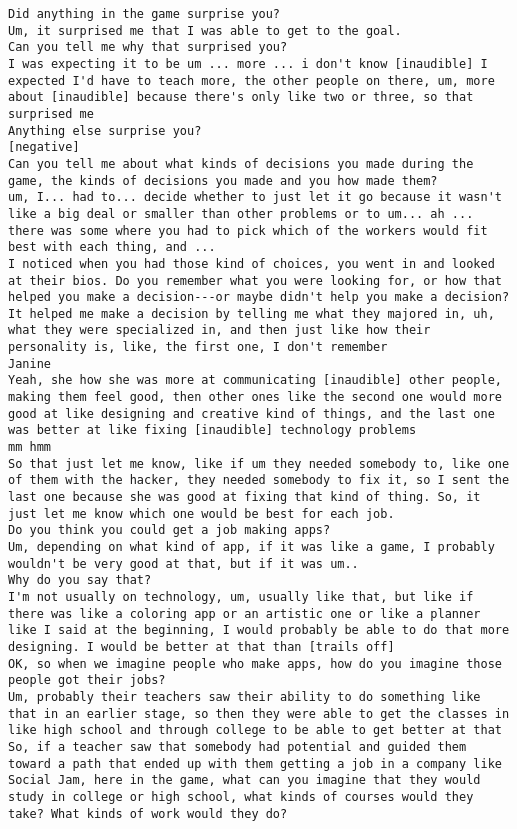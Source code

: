\begin{lstlisting}
Did anything in the game surprise you?
Um, it surprised me that I was able to get to the goal. 
Can you tell me why that surprised you?
I was expecting it to be um ... more ... i don't know [inaudible] I expected I'd have to teach more, the other people on there, um, more about [inaudible] because there's only like two or three, so that surprised me
Anything else surprise you?
[negative]
Can you tell me about what kinds of decisions you made during the game, the kinds of decisions you made and you how made them?
um, I... had to... decide whether to just let it go because it wasn't like a big deal or smaller than other problems or to um... ah ... there was some where you had to pick which of the workers would fit best with each thing, and ... 
I noticed when you had those kind of choices, you went in and looked at their bios. Do you remember what you were looking for, or how that helped you make a decision---or maybe didn't help you make a decision?
It helped me make a decision by telling me what they majored in, uh, what they were specialized in, and then just like how their personality is, like, the first one, I don't remember
Janine
Yeah, she how she was more at communicating [inaudible] other people, making them feel good, then other ones like the second one would more good at like designing and creative kind of things, and the last one was better at like fixing [inaudible] technology problems
mm hmm
So that just let me know, like if um they needed somebody to, like one of them with the hacker, they needed somebody to fix it, so I sent the last one because she was good at fixing that kind of thing. So, it just let me know which one would be best for each job.
Do you think you could get a job making apps?
Um, depending on what kind of app, if it was like a game, I probably wouldn't be very good at that, but if it was um..
Why do you say that?
I'm not usually on technology, um, usually like that, but like if there was like a coloring app or an artistic one or like a planner like I said at the beginning, I would probably be able to do that more designing. I would be better at that than [trails off]
OK, so when we imagine people who make apps, how do you imagine those people got their jobs?
Um, probably their teachers saw their ability to do something like that in an earlier stage, so then they were able to get the classes in like high school and through college to be able to get better at that
So, if a teacher saw that somebody had potential and guided them toward a path that ended up with them getting a job in a company like Social Jam, here in the game, what can you imagine that they would study in college or high school, what kinds of courses would they take? What kinds of work would they do?

\end{lstlisting}
